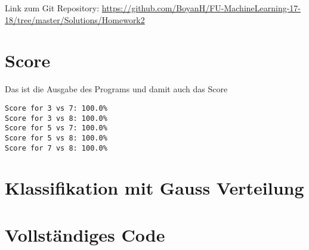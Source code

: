 \usepackage{graphicx}
\usepackage{amsmath}
\usepackage{amssymb}
\usepackage{fancyvrb}

\newcommand{\dozent}{Prof. R. Rojas}					%
\newcommand{\projectNo}{2}
\newcommand{\veranstaltung}{Mustererkennung}
\newcommand{\semester}{WS17/18}
\newcommand{\studenten}{Boyan Hristov, Nedeltscho Petrov}





Link zum Git Repository: \url{https://github.com/BoyanH/FU-MachineLearning-17-18/tree/master/Solutions/Homework\projectNo}


\section*{Score}
Das ist die Ausgabe des Programs und damit auch das Score
\begin{lstlisting}
Score for 3 vs 7: 100.0%
Score for 3 vs 8: 100.0%
Score for 5 vs 7: 100.0%
Score for 5 vs 8: 100.0%
Score for 7 vs 8: 100.0%
\end{lstlisting}

\section*{Klassifikation mit Gauss Verteilung}


\section*{Vollständiges Code}

